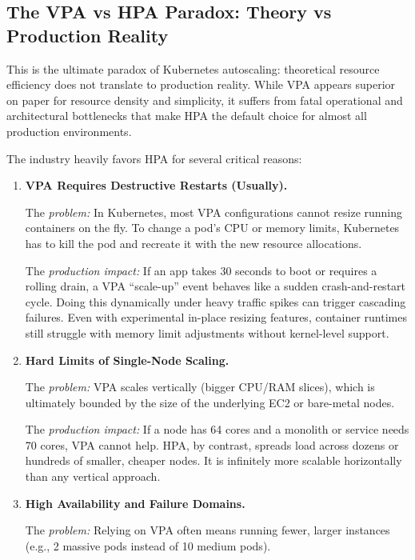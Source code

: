 \documentclass[11pt,a4paper]{article}
\begin{document}
\subsection{The VPA vs HPA Paradox: Theory vs Production Reality}

This is the ultimate paradox of Kubernetes autoscaling: theoretical resource efficiency does not translate to production reality. While VPA appears superior on paper for resource density and simplicity, it suffers from fatal operational and architectural bottlenecks that make HPA the default choice for almost all production environments.

The industry heavily favors HPA for several critical reasons:

\begin{enumerate}[leftmargin=1.5em]
	\item \textbf{VPA Requires Destructive Restarts (Usually).}
	
	The \emph{problem:} In Kubernetes, most VPA configurations cannot resize running containers on the fly. To change a pod's CPU or memory limits, Kubernetes has to kill the pod and recreate it with the new resource allocations.
	
	The \emph{production impact:} If an app takes 30 seconds to boot or requires a rolling drain, a VPA ``scale-up'' event behaves like a sudden crash-and-restart cycle. Doing this dynamically under heavy traffic spikes can trigger cascading failures. Even with experimental in-place resizing features, container runtimes still struggle with memory limit adjustments without kernel-level support.

	\item \textbf{Hard Limits of Single-Node Scaling.}
	
	The \emph{problem:} VPA scales vertically (bigger CPU/RAM slices), which is ultimately bounded by the size of the underlying EC2 or bare-metal nodes.
	
	The \emph{production impact:} If a node has 64 cores and a monolith or service needs 70 cores, VPA cannot help. HPA, by contrast, spreads load across dozens or hundreds of smaller, cheaper nodes. It is infinitely more scalable horizontally than any vertical approach.

	\item \textbf{High Availability and Failure Domains.}
	
	The \emph{problem:} Relying on VPA often means running fewer, larger instances (e.g., 2 massive pods instead of 10 medium pods).
	

\end{enumerate}
\end{document}
